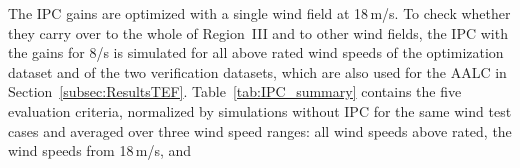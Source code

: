 The IPC gains are optimized with a single wind field at 18\,m/s. To check whether they carry over to the whole of Region~III and to other wind fields, the IPC with the gains for 8\textdegree/s is simulated for all above rated wind speeds of the optimization dataset and of the two verification datasets, which are also used for the AALC in Section~\ref{subsec:ResultsTEF}. Table~\ref{tab:IPC_summary} contains the five evaluation criteria, normalized by simulations without IPC for the same wind test cases and averaged over three wind speed ranges: all wind speeds above rated, the wind speeds from 18\,m/s, and 
%
